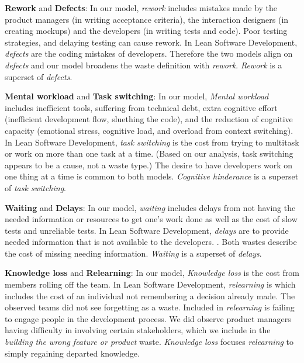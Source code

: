 
\textbf{Rework} and \textbf{Defects}: In our model, \textit{rework} includes mistakes made by the product managers (in writing acceptance criteria), the interaction designers (in creating mockups) and the developers (in writing tests and code). Poor testing strategies, and delaying testing can cause rework. In Lean Software Development, \textit{defects} are the coding mistakes of developers. Therefore the two models align on \textit{defects} and our model broadens the waste definition with \textit{rework}. \textit{Rework} is a superset of \textit{defects}. 

\textbf{Mental workload} and \textbf{Task switching}: In our model, \textit{Mental workload} includes inefficient tools, suffering from technical debt, extra cognitive effort (inefficient development flow, sluething the code), and the reduction of cognitive capacity (emotional stress, cognitive load, and overload from context switching). In Lean Software Development, \textit{task switching} is the cost from trying to multitask or work on more than one task at a time. (Based on our analysis, task switching appears to be a cause, not a waste type.) The desire to have developers work on one thing at a time is common to both models. \textit{Cognitive hinderance} is a superset of \textit{task switching}. 

\textbf{Waiting} and \textbf{Delays}: In our model, \textit{waiting} includes delays from not having the needed information or resources to get one's work done as well as the cost of slow tests and unreliable tests. In Lean Software Development, \textit{delays} are  to provide needed information that is not available to the developers. \cite{PoppendieckConceptToCash}. Both wastes describe the cost of missing needing information. \textit{Waiting} is a superset of \textit{delays}.

\textbf{Knowledge loss} and \textbf{Relearning}:
 In our model, \textit{Knowledge loss} is the cost from members rolling off the team. In Lean Software Development, \textit{relearning} is  \cite{PoppendieckConceptToCash} which includes the cost of an individual not remembering a decision already made. The observed teams did not see forgetting as a waste.  Included in \textit{relearning} is failing to engage people in the development process. We did observe product managers having difficulty in involving certain stakeholders, which we include in the \textit{building the wrong feature or product} waste. \textit{Knowledge loss} focuses \textit{relearning} to simply regaining departed knowledge. 
